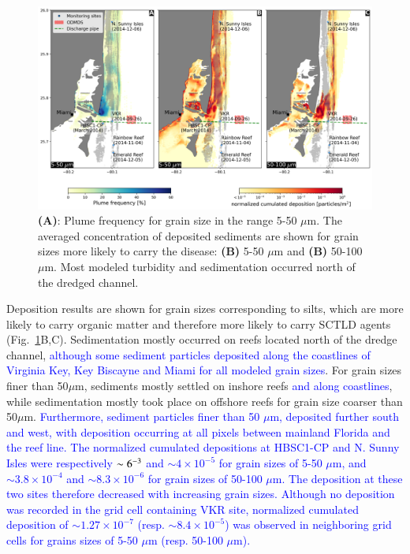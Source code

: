 \documentclass[preprint,12pt,authoryear]{elsarticle}
\newcommand{\modif}[1]{\textcolor{blue}{#1}}
\begin{document}
\begin{figure}
	\centering
	\includegraphics[width=\textwidth]{figures/fig2_stokes4.png}
	\caption{\textbf{(A)}: Plume frequency for grain size in the range 5-50 $\mu$m. The averaged concentration of deposited sediments are shown for grain sizes more likely to carry the disease: \textbf{(B)} 5-50 $\mu$m and \textbf{(B)} 50-100 $\mu$m. Most modeled turbidity and sedimentation occurred north of the dredged channel.}
	\label{fig:onset_depo}
\end{figure}

Deposition results are shown for grain sizes corresponding to silts, which are more likely to carry organic matter and therefore more likely to carry SCTLD agents \citep{erftemeijer2012environmental}(Fig.~\ref{fig:onset_depo}B,C). Sedimentation mostly occurred on reefs located north of the dredge channel, \modif{although some sediment particles deposited along the coastlines of Virginia Key, Key Biscayne and Miami for all modeled grain sizes}. For grain sizes finer than 50$\mu$m, sediments mostly settled on inshore reefs \modif{and along coastlines}, while sedimentation mostly took place on offshore reefs for grain size coarser than 50$\mu$m. \modif{Furthermore, sediment particles finer than 50 $\mu$m, deposited further south and west, with deposition occurring at all pixels between mainland Florida and the reef line. The normalized cumulated depositions at HBSC1-CP and N. Sunny Isles were respectively $\sim6\time10^{-3}$ and $\sim4\times10^{-5}$ for grain sizes of 5-50 $\mu$m, and  $\sim3.8\times10^{-4}$ and $\sim8.3\times 10^{-6}$ for grain sizes of 50-100 $\mu$m. The deposition at these two sites therefore decreased with increasing grain sizes. Although no deposition was recorded in the grid cell containing VKR site, normalized cumulated deposition of $\sim1.27\times10^{-7}$ (resp. $\sim 8.4\times10^{-5}$) was observed in neighboring grid cells for grains sizes of 5-50 $\mu$m (resp. 50-100 $\mu$m).} %
\end{document}
